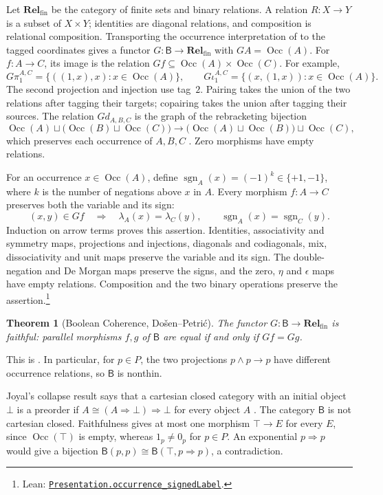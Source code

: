 \documentclass[11pt]{article}
\newtheorem{theorem}{Theorem}[section]
\newcommand{\B}{\mathsf B}
\newcommand{\Occ}{\operatorname{Occ}}
\newcommand{\Rel}{\mathbf{Rel}_{\mathrm{fin}}}
\begin{document}
Let $\Rel$ be the category of finite sets and binary relations.
A relation $R:X\to Y$ is a subset of $X\times Y$; identities are
diagonal relations, and composition is relational composition.
Transporting the occurrence interpretation of \cite{DP} to the
tagged coordinates gives a functor
$G:\B\to\Rel$ with $GA=\Occ(A)$. For $f:A\to C$, its image is
the relation $Gf\subseteq\Occ(A)\times\Occ(C)$.
For example,
\[
 G\pi_1^{A,C}=\{((1,x),x):x\in\Occ(A)\},\qquad
 G\iota_1^{A,C}=\{(x,(1,x)):x\in\Occ(A)\}.
\]
The second projection and injection use tag~$2$. Pairing takes the
union of the two relations after tagging their targets; copairing
takes the union after tagging their sources. The relation $Gd_{A,B,C}$
is the graph of the rebracketing bijection
\[
 \Occ(A)\sqcup\bigl(\Occ(B)\sqcup\Occ(C)\bigr)
 \longrightarrow
 \bigl(\Occ(A)\sqcup\Occ(B)\bigr)\sqcup\Occ(C),
\]
which preserves each occurrence of $A,B,C$
\cite[\S2.9, p.~60]{DP}. Zero morphisms have empty relations.

For an occurrence $x\in\Occ(A)$, define
$\operatorname{sgn}_A(x)=(-1)^k\in\{+1,-1\}$, where $k$ is the
number of negations above $x$ in $A$. Every morphism $f:A\to C$
preserves both the variable and its sign:
\[
 (x,y)\in Gf\quad\Longrightarrow\quad
 \lambda_A(x)=\lambda_C(y),\qquad
 \operatorname{sgn}_A(x)=\operatorname{sgn}_C(y).
\]
Induction on arrow terms proves this assertion. Identities,
associativity and symmetry maps, projections and injections,
diagonals and codiagonals, mix, dissociativity and unit maps
preserve the variable and its sign. The double-negation and
De Morgan maps preserve the signs, and the zero,
$\eta$ and $\epsilon$ maps have empty relations. Composition and
the two binary operations preserve the assertion.\footnote{\raggedright Lean:
\href{https://github.com/flengyel/Dosen-Petric-Maximality/blob/dosen-petric-v25-palomar-v3/DosenPetric/PresentationSignedLabels.lean\#L73}{\texttt{Presentation.\allowbreak{}occurrence\_signedLabel}}.}

\begin{theorem}[Boolean Coherence, Do\v{s}en--Petri\'c]
\label{thm:coherence}
The functor $G:\B\to\Rel$ is faithful: parallel morphisms $f,g$ of
$\B$ are equal if and only if $Gf=Gg$.
\end{theorem}

This is \cite[\S14.2, p.~321]{DP}. In particular, for $p\in P$, the
two projections $p\wedge p\to p$ have different occurrence
relations, so $\B$ is nonthin.

Joyal's collapse result says that a cartesian closed category with
an initial object $\bot$ is a preorder if
$A\cong(A\Rightarrow\bot)\Rightarrow\bot$ for every object $A$
\cite[\S14.3, p.~324]{DP}.
The category $\B$ is not cartesian closed. Faithfulness gives at most
one morphism $\top\to E$ for every $E$, since $\Occ(\top)$ is empty,
whereas $1_p\ne0_p$ for $p\in P$. An exponential $p\Rightarrow p$
would give a bijection $\B(p,p)\cong\B(\top,p\Rightarrow p)$,
a contradiction.
\end{document}
